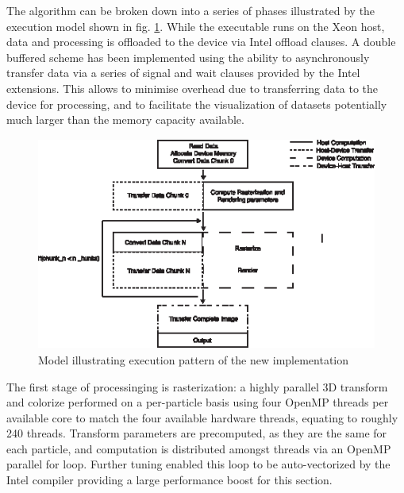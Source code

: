 \documentclass[runningheads,a4paper]{llncs}
\begin{document}
The algorithm can be broken down into a series of phases illustrated by the execution model shown in fig. \ref{fig:exmodel}.
While the executable runs on the Xeon host, data and processing is offloaded to the device via Intel offload clauses.
A double buffered scheme has been implemented using the ability to asynchronously transfer data via a series of signal 
and wait clauses provided by the Intel extensions. This allows to minimise overhead due to transferring data to the device 
for processing, and to facilitate the visualization of datasets potentially much larger than the memory capacity available.

\begin{figure}
\centering
\includegraphics[height=7.0cm]{ExecutionModel}
\caption{Model illustrating execution pattern of the new implementation}
\label{fig:exmodel}
\end{figure}


The first stage of processinging is rasterization: a highly parallel 3D transform and colorize performed on a per-particle 
basis using four OpenMP threads per available core to match the four available hardware threads, equating to roughly 240 threads. 
Transform parameters are precomputed, as they are the same for each particle, and computation is distributed amongst 
threads via an OpenMP parallel for loop. Further tuning enabled this loop to be auto-vectorized by the Intel compiler 
providing a large performance boost for this section.
\end{document}
